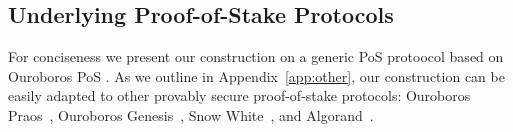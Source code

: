 



\subsection{Underlying Proof-of-Stake Protocols}
\label{sec:ouroboros}
\label{sec:pos}

For conciseness we present our construction on a generic PoS protoocol
 based on  Ouroboros PoS \cite{C:KRDO17}. As we outline
in Appendix~\ref{app:other}, our construction can  be easily adapted to other
provably secure proof-of-stake protocols: Ouroboros
Praos~\cite{EC:DGKR18}, Ouroboros Genesis~\cite{genesis}, Snow
White~\cite{DBLP:journals/iacr/BentovPS16a}, and Algorand~\cite{algorand}.
